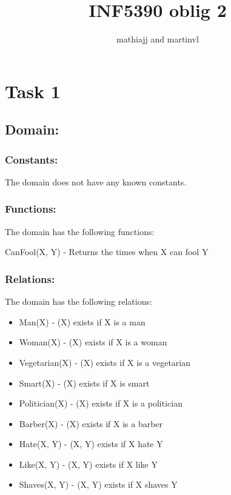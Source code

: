 \documentclass[a4paper, english, 11pt]{article}
\title{INF5390 oblig 2}
\author{mathiajj and martinvl}
\begin{document}
\maketitle

\section*{Task 1}

\subsection*{Domain:}

\subsubsection*{Constants:}

The domain does not have any known constants.

\subsubsection*{Functions:}

The domain has the following functions:

CanFool(X, Y) - Returns the times when X can fool Y

\subsubsection*{Relations:}

The domain has the following relations:

\begin{itemize}

	\item
	Man(X) - (X) exists if X is a man
	\item
	Woman(X) - (X) exists if X is a woman
	\item
	Vegetarian(X) - (X) exists if X is a vegetarian
	\item
	Smart(X) - (X) exists if X is smart
	\item
	Politician(X) - (X) exists if X is a politician
	\item
	Barber(X) - (X) exists if X is a barber
	\item
	Hate(X, Y) - (X, Y) exists if X hate Y
	\item
	Like(X, Y) - (X, Y) exists if X like Y
	\item
	Shaves(X, Y) - (X, Y) exists if X shaves Y

\end{itemize}
\end{document}
